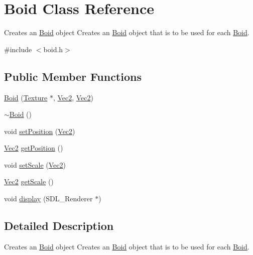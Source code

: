 \hypertarget{class_boid}{\section{Boid Class Reference}
\label{class_boid}
}


Creates an \hyperlink{class_boid}{Boid} object Creates an \hyperlink{class_boid}{Boid} object that is to be used for each \hyperlink{class_boid}{Boid}.  




{\ttfamily \#include $<$boid.\+h$>$}

\subsection*{Public Member Functions}
\begin{DoxyCompactItemize}
\item 
\hyperlink{class_boid_aa0c991f0bbe21209e22fcf81002dab11}{Boid} (\hyperlink{class_texture}{Texture} $\ast$, \hyperlink{struct_vec2}{Vec2}, \hyperlink{struct_vec2}{Vec2})
\item 
\hyperlink{class_boid_a712f84ddc1b8ad06ad7ecd6c10a1666c}{$\sim$\+Boid} ()
\item 
void \hyperlink{class_boid_a62ebe99b4a19edfc2d0a6f1ac58e9658}{set\+Position} (\hyperlink{struct_vec2}{Vec2})
\item 
\hyperlink{struct_vec2}{Vec2} \hyperlink{class_boid_a4f21bfa041637ffcce13c56764fd3c9f}{get\+Position} ()
\item 
void \hyperlink{class_boid_a4443fb5d1fb425b9fede21c3cee2ba84}{set\+Scale} (\hyperlink{struct_vec2}{Vec2})
\item 
\hyperlink{struct_vec2}{Vec2} \hyperlink{class_boid_a3a5d507c214ebd3bf9eda04e2157c4b5}{get\+Scale} ()
\item 
void \hyperlink{class_boid_ad522fbcf60e6e318c785ca7b04091472}{display} (S\+D\+L\+\_\+\+Renderer $\ast$)
\end{DoxyCompactItemize}


\subsection{Detailed Description}
Creates an \hyperlink{class_boid}{Boid} object Creates an \hyperlink{class_boid}{Boid} object that is to be used for each \hyperlink{class_boid}{Boid}. 

